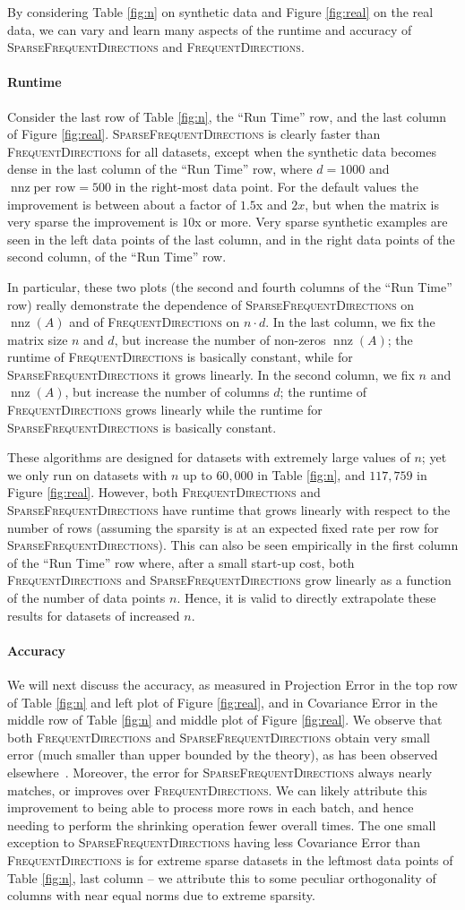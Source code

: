 \documentclass[11pt]{article}
\newcommand{\nnz}{\operatorname{nnz}}
\newcommand{\fd}{\textsc{FrequentDirections}\xspace}
\newcommand{\sfd}{\textsc{SparseFrequentDirections}\xspace}
\newcommand{\Paragraph}[1]{\paragraph*{\sffamily \textbf{#1}}}
\begin{document}
By considering Table \ref{fig:n} on synthetic data and Figure \ref{fig:real} on the real data, we can vary and learn many aspects of the runtime and accuracy of \sfd and \fd.  

\Paragraph{Runtime}
Consider the last row of Table \ref{fig:n}, the ``Run Time'' row, and the last column of Figure \ref{fig:real}.  
\sfd is clearly faster than \fd for all datasets, except when the synthetic data becomes dense in the last column of the ``Run Time'' row, where $d=1000$ and $\nnz \text{per row} = 500$ in the right-most data point.  For the default values the improvement is between about a factor of $1.5$x and $2x$, but when the matrix is very sparse the improvement is $10$x or more.  Very sparse synthetic examples are seen in the left data points of the last column, and in the right data points of the second column, of the ``Run Time'' row. 

In particular, these two plots (the second and fourth columns of the ``Run Time'' row) really demonstrate the dependence of \sfd on $\nnz(A)$ and of \fd on $n\cdot d$.  
In the last column, we fix the matrix size $n$ and $d$, but increase the number of non-zeros $\nnz(A)$; the runtime of \fd is basically constant, while for \sfd it grows linearly.  
In the second column, we fix $n$ and $\nnz(A)$, but increase the number of columns $d$; the runtime of \fd grows linearly while the runtime for \sfd is basically constant.  

These algorithms are designed for datasets with extremely large values of $n$; yet we only run on datasets with $n$ up to $60{,}000$ in Table \ref{fig:n}, and $117{,}759$ in Figure \ref{fig:real}.  However, both \fd and \sfd have runtime that grows linearly with respect to the number of rows (assuming the sparsity is at an expected fixed rate per row for \sfd).  This can also be seen empirically in the first column of the ``Run Time'' row where, after a small start-up cost, both \fd and \sfd grow linearly as a function of the number of data points $n$.  Hence, it is valid to directly extrapolate these results for datasets of increased $n$.  

\Paragraph{Accuracy}
We will next discuss the accuracy, as measured in Projection Error in the top row of Table \ref{fig:n} and left plot of Figure \ref{fig:real}, and in Covariance Error in the middle row of Table \ref{fig:n} and middle plot of Figure \ref{fig:real}.  
We observe that both \fd and \sfd obtain very small error (much smaller than upper bounded by the theory), as has been observed elsewhere~\cite{ghashami2015frequent,desai2015improved}.  Moreover, the error for \sfd always nearly matches, or improves over \fd.  We can likely attribute this improvement to being able to process more rows in each batch, and hence needing to perform the shrinking operation fewer overall times.  
The one small exception to \sfd having less Covariance Error than \fd is for extreme sparse datasets in the leftmost data points of Table \ref{fig:n}, last column -- we attribute this to some peculiar orthogonality of columns with near equal norms due to extreme sparsity.  








\end{document}
